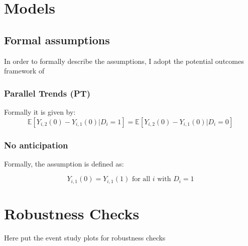 \documentclass[12pt]{article}
\begin{document}
\section{Models}\label{app:models}

\subsection{Formal assumptions}\label{app:models:assumptions}
In order to formally describe the assumptions, I adopt the potential outcomes framework of~\cite{rubinEstimatingCausalEffects1974}

\subsubsection{Parallel Trends (PT)}

Formally it is given by: 
\begin{equation}
    \mathbb{E}[Y_{i,2}(0) - Y_{i,1}(0) | D_i = 1] = \mathbb{E}[Y_{i,2}(0) - Y_{i,1}(0) | D_i = 0]
\end{equation}

\subsubsection{No anticipation}
Formally, the assumption is defined as:

\begin{equation}
    Y_{i,1}(0) = Y_{i,1}(1) \text{ for all } i \text{ with } D_i = 1
\end{equation}



\section{Robustness Checks}

Here put the event study plots for robustness checks
\end{document}
